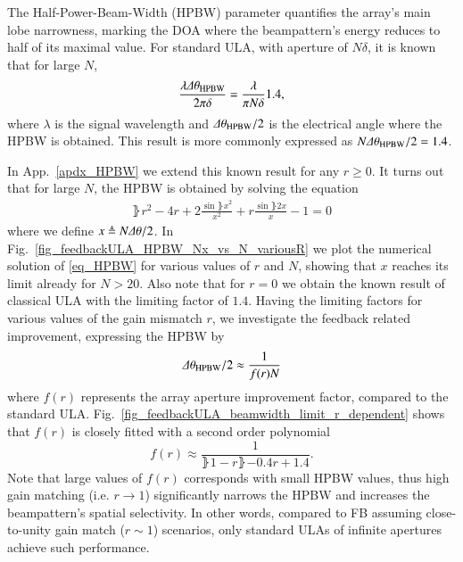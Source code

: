 The Half-Power-Beam-Width (HPBW) parameter quantifies the array's main lobe narrowness, marking the DOA where the beampattern's energy reduces to half of its maximal value.
For standard ULA, with aperture of $N\delta$, it is known \cite{van2004optimum} that for large $N$,
$$
 \frac{\lambda\Delta\theta_{\text{HPBW}}}{2\pi{}\delta} = \frac{\lambda}{\pi{}N\delta}1.4,
$$
where $\lambda$ is the signal wavelength and $\Delta\theta_{\text{HPBW}}/2$ is the electrical angle where the HPBW is obtained. This result is more commonly expressed as $N\Delta\theta_{\text{HPBW}}/2= 1.4$. 
\par In App.~\ref{apdx_HPBW} we extend this known result for any $r\geq 0$. It turns out that for large $N$, the HPBW is obtained by solving the equation
\begin{equation}\label{eq_HPBW}
        \begin{split}
            \rBrace{r^{2}-4r+2}\frac{\sin{\rBrace{x}}^{2}}{x^{2}}+r\frac{\sin{\rBrace{2x}}}{x}-1=0
        \end{split}
\end{equation}
where we define $x\triangleq{} N\Delta\theta/2$. In Fig.~\ref{fig_feedbackULA_HPBW_Nx_vs_N_variousR} we plot the numerical solution of \eqref{eq_HPBW} for various values of $r$ and $N$, showing that $x$ reaches its limit already for $N>20$. Also note that for $r=0$ we obtain the known result of classical ULA with the limiting factor of $1.4$.
Having the limiting factors for various values of the gain mismatch $r$, we investigate the feedback related improvement, expressing the HPBW by
\[
\Delta\theta_{\text{HPBW}}/2\approx \frac{1}{f(r)N}
\]
where $f(r)$ represents the array aperture improvement factor, compared to the standard ULA. 
Fig.~\ref{fig_feedbackULA_beamwidth_limit_r_dependent} shows that $f(r)$ is closely fitted with a second order polynomial
\begin{equation}
    \label{eq_Bapprox}
    f(r)\approx\frac{1}{\rBrace{1-r}\rBrace{-0.4r+1.4}}.
\end{equation}
Note that large values of $f(r)$ corresponds with small HPBW values, thus high gain matching (i.e. $r\to1$) significantly narrows the HPBW and increases the beampattern's spatial selectivity. 
In other words, compared to FB assuming close-to-unity gain match ($r\sim1$) scenarios, only standard ULAs of infinite apertures achieve such performance.
